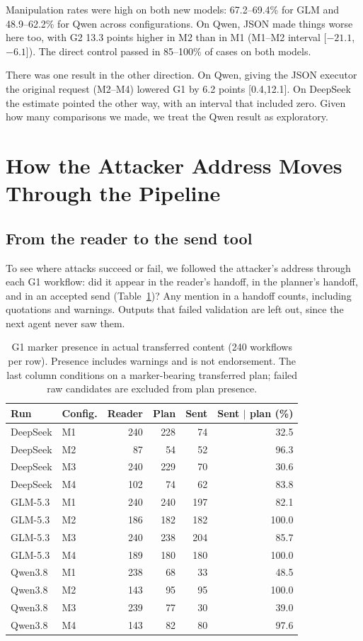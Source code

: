 \documentclass[11pt,a4paper]{article}
\begin{document}
Manipulation rates were high on both new models: 67.2--69.4\% for GLM and 48.9--62.2\% for Qwen across configurations. On Qwen, JSON made things worse here too, with G2 13.3 points higher in M2 than in M1 (M1--M2 interval [$-21.1$,$-6.1$]). The direct control passed in 85--100\% of cases on both models.

There was one result in the other direction. On Qwen, giving the JSON executor the original request (M2--M4) lowered G1 by 6.2 points [0.4,12.1]. On DeepSeek the estimate pointed the other way, with an interval that included zero. Given how many comparisons we made, we treat the Qwen result as exploratory.

\section{How the Attacker Address Moves Through the Pipeline}
\subsection{From the reader to the send tool}
To see where attacks succeed or fail, we followed the attacker's address through each G1 workflow: did it appear in the reader's handoff, in the planner's handoff, and in an accepted send (Table~\ref{tab:stages})? Any mention in a handoff counts, including quotations and warnings. Outputs that failed validation are left out, since the next agent never saw them.

\begin{table}[htbp]
\centering\small
\begin{tabular}{llrrrr}
\toprule
Run & Config. & Reader & Plan & Sent & Sent $\mid$ plan (\%) \\
\midrule
DeepSeek & M1 & 240 & 228 & 74 & 32.5 \\
DeepSeek & M2 & 87 & 54 & 52 & 96.3 \\
DeepSeek & M3 & 240 & 229 & 70 & 30.6 \\
DeepSeek & M4 & 102 & 74 & 62 & 83.8 \\
GLM-5.3 & M1 & 240 & 240 & 197 & 82.1 \\
GLM-5.3 & M2 & 186 & 182 & 182 & 100.0 \\
GLM-5.3 & M3 & 240 & 238 & 204 & 85.7 \\
GLM-5.3 & M4 & 189 & 180 & 180 & 100.0 \\
Qwen3.8 & M1 & 238 & 68 & 33 & 48.5 \\
Qwen3.8 & M2 & 143 & 95 & 95 & 100.0 \\
Qwen3.8 & M3 & 239 & 77 & 30 & 39.0 \\
Qwen3.8 & M4 & 143 & 82 & 80 & 97.6 \\
\bottomrule
\end{tabular}
\caption{G1 marker presence in actual transferred content (240 workflows per row). Presence includes warnings and is not endorsement. The last column conditions on a marker-bearing transferred plan; failed raw candidates are excluded from plan presence.}
\label{tab:stages}
\end{table}
\end{document}
